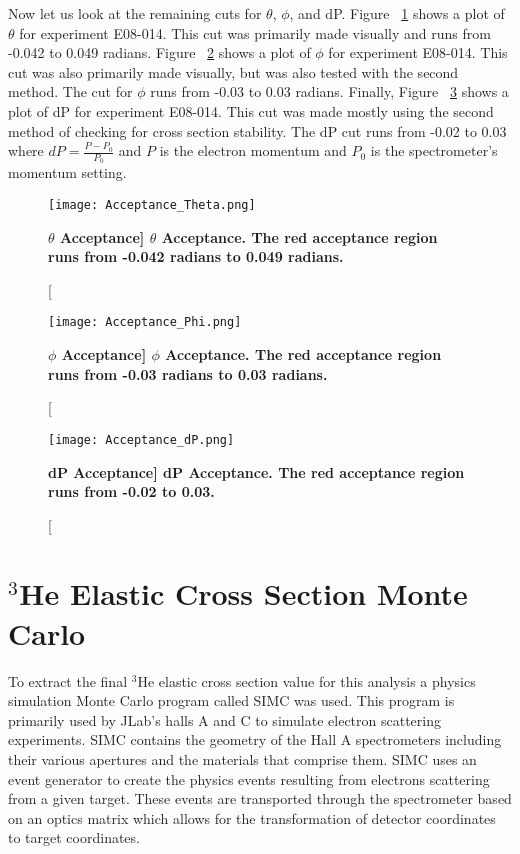 Now let us look at the remaining cuts for $\theta$, $\phi$, and dP. Figure ~\ref{fig:acceptance_th} shows a plot of $\theta$ for experiment E08-014. This cut was primarily made visually and runs from -0.042 to 0.049 radians. Figure ~\ref{fig:acceptance_ph} shows a plot of $\phi$ for experiment E08-014. This cut was also primarily made visually, but was also tested with the second method. The cut for $\phi$ runs from -0.03 to 0.03 radians. Finally, Figure ~\ref{fig:acceptance_dp} shows a plot of dP for experiment E08-014. This cut was made mostly using the second method of checking for cross section stability. The dP cut runs from -0.02 to 0.03 where $dP = \frac{P-P_0}{P_0}$ and $P$ is the electron momentum and $P_0$ is the spectrometer's momentum setting.

\begin{figure}[!ht]
\begin{center}
\texttt{[image: Acceptance\_Theta.png]}
\end{center}
\caption[\bf{$\theta$ Acceptance}]{
{\bf{$\theta$ Acceptance.}} The red acceptance region runs from -0.042 radians to 0.049 radians.}
\label{fig:acceptance_th}
\end{figure}

\begin{figure}[!ht]
\begin{center}
\texttt{[image: Acceptance\_Phi.png]}
\end{center}
\caption[\bf{$\phi$ Acceptance}]{
{\bf{$\phi$ Acceptance.}} The red acceptance region runs from -0.03 radians to 0.03 radians.}
\label{fig:acceptance_ph}
\end{figure}

\begin{figure}[!ht]
\begin{center}
\texttt{[image: Acceptance\_dP.png]}
\end{center}
\caption[\bf{dP Acceptance}]{
{\bf{dP Acceptance.}} The red acceptance region runs from -0.02 to 0.03.}
\label{fig:acceptance_dp}
\end{figure}

\section{$^3$He Elastic Cross Section Monte Carlo}
\label{sec:simc}

To extract the final $^3$He elastic cross section value for this analysis a physics simulation Monte Carlo program called SIMC was used. This program is primarily used by JLab's halls A and C to simulate electron scattering experiments. SIMC contains the geometry of the Hall A spectrometers including their various apertures and the materials that comprise them. SIMC uses an event generator to create the physics events resulting from electrons scattering from a given target. These events are transported through the spectrometer based on an optics matrix which allows for the transformation of detector coordinates to target coordinates. 

